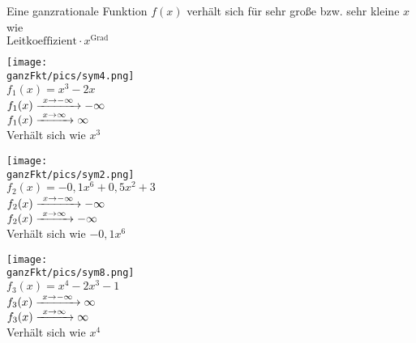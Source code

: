\begin{tcolorbox}\centering
	\textcolor{loestc}{Eine ganzrationale Funktion \(f(x)\) verhält sich für sehr große bzw. sehr kleine \(x\) wie\\ \(\text{Leitkoeffizient}\cdot x^{\text{Grad}}\)\\ \vspace{0.2cm}}
\end{tcolorbox}
\begin{minipage}{\textwidth}
	\begin{minipage}{0.32\textwidth}\centering
		\texttt{[image: \\ganzFkt/pics/sym4.png]}\\
		\(f_1(x)=x^3-2x\)\\
		\textcolor{loes}{\(f_1(x)\xrightarrow{\hphantom{\ }x\to-\infty\hphantom{\ }}-\infty\)\\
			\(f_1(x)\xrightarrow{\hphantom{\ }x\to\infty\hphantom{\ }}\infty\)}\\
		\textcolor{loes}{Verhält sich wie \(x^3\)}
	\end{minipage}
	\begin{minipage}{0.32\textwidth}\centering
		\texttt{[image: \\ganzFkt/pics/sym2.png]}\\
		\(f_2(x)=-0,1x^6+0,5x^2+3\)\\
		\textcolor{loes}{\(f_2(x)\xrightarrow{\hphantom{\ }x\to-\infty\hphantom{\ }}-\infty\)\\
			\(f_2(x)\xrightarrow{\hphantom{\ }x\to\infty\hphantom{\ }}-\infty\)}\\
		\textcolor{loes}{Verhält sich wie \(-0,1x^6\)}
	\end{minipage}
	\begin{minipage}{0.32\textwidth}\centering
		\texttt{[image: \\ganzFkt/pics/sym8.png]}\\
		\(f_3(x)=x^4-2x^3-1\)\\
		\textcolor{loes}{\(f_3(x)\xrightarrow{\hphantom{\ }x\to-\infty\hphantom{\ }}\infty\)\\
			\(f_3(x)\xrightarrow{\hphantom{\ }x\to\infty\hphantom{\ }}\infty\)}\\
		\textcolor{loes}{Verhält sich wie \(x^4\)}
	\end{minipage}\\ \vspace{0.2cm}\\

\end{minipage}
